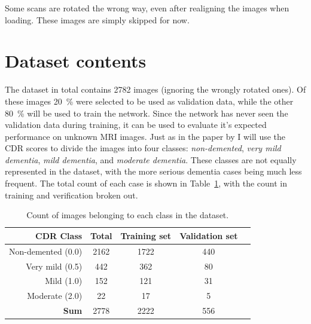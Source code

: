 \documentclass{kththesis}
\begin{document}
Some scans are rotated the wrong way, even after realigning the images when loading. These images are simply skipped for now.

\section{Dataset contents}
The dataset in total contains 2782 images (ignoring the wrongly rotated ones). Of these images 20~\% were selected to be used as validation data, while the other 80~\% will be used to train the network. Since the network has never seen the validation data during training, it can be used to evaluate it's expected performance on unknown MRI images. Just as in the paper by \textcite{islam2018early} I will use the CDR scores to divide the images into four classes: \textit{non-demented}, \textit{very mild dementia}, \textit{mild dementia}, and \textit{moderate dementia}. These classes are not equally represented in the dataset, with the more serious dementia cases being much less frequent. The total count of each case is shown in Table~\ref{tab:dataset_contents}, with the count in training and verification broken out.

\begin{table}[h]
  \begin{center}
    \caption{Count of images belonging to each class in the dataset.\label{tab:dataset_contents}}
    \begin{tabular}{r|cccc}
      \textbf{CDR Class} & \textbf{Total} & \textbf{Training set} & \textbf{Validation set} \\
      \toprule
      Non-demented (0.0) & 2162 & 1722 & 440 \\
      Very mild (0.5) & 442 & 362 & 80 \\
      Mild (1.0) & 152 & 121 & 31 \\
      Moderate (2.0) & 22 & 17 & 5 \\
      \bottomrule
      \textbf{Sum} & 2778 & 2222 & 556 \\
    \end{tabular}
  \end{center}
\end{table}

\end{document}
